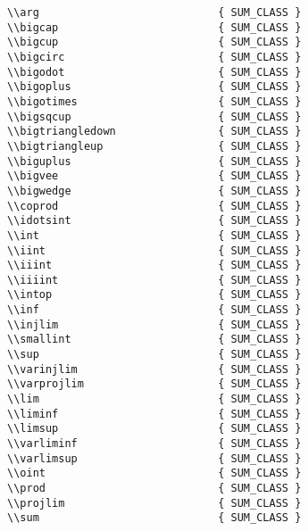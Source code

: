 \begin{verbatim}
\\arg                            { SUM_CLASS }
\\bigcap                         { SUM_CLASS }
\\bigcup                         { SUM_CLASS }
\\bigcirc                        { SUM_CLASS }
\\bigodot                        { SUM_CLASS }
\\bigoplus                       { SUM_CLASS }
\\bigotimes                      { SUM_CLASS }
\\bigsqcup                       { SUM_CLASS }
\\bigtriangledown                { SUM_CLASS }
\\bigtriangleup                  { SUM_CLASS }
\\biguplus                       { SUM_CLASS }
\\bigvee                         { SUM_CLASS }
\\bigwedge                       { SUM_CLASS }
\\coprod                         { SUM_CLASS }
\\idotsint                       { SUM_CLASS }
\\int                            { SUM_CLASS }
\\iint                           { SUM_CLASS }
\\iiint                          { SUM_CLASS }
\\iiiint                         { SUM_CLASS }
\\intop                          { SUM_CLASS }
\\inf                            { SUM_CLASS }
\\injlim                         { SUM_CLASS }
\\smallint                       { SUM_CLASS }
\\sup                            { SUM_CLASS }
\\varinjlim                      { SUM_CLASS }
\\varprojlim                     { SUM_CLASS }
\\lim                            { SUM_CLASS }
\\liminf                         { SUM_CLASS }
\\limsup                         { SUM_CLASS }
\\varliminf                      { SUM_CLASS }
\\varlimsup                      { SUM_CLASS }
\\oint                           { SUM_CLASS }
\\prod                           { SUM_CLASS }
\\projlim                        { SUM_CLASS }
\\sum                            { SUM_CLASS }

\end{verbatim}
